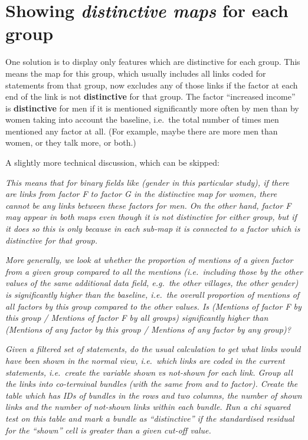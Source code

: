 \documentclass[
]{book}
\begin{document}
\hypertarget{showing-distinctive-maps-for-each-group}{%
\section{\texorpdfstring{Showing \emph{distinctive maps} for each group}{Showing distinctive maps for each group}}\label{showing-distinctive-maps-for-each-group}}

One solution is to display only features which are distinctive for each group. This means the map for this group, which usually includes all links coded for statements from that group, now excludes any of those links if the factor at each end of the link is not \textbf{distinctive} for that group. The factor ``increased income'' is \textbf{distinctive} for men if it is mentioned significantly more often by men than by women taking into account the baseline, i.e.~the total number of times men mentioned any factor at all. (For example, maybe there are more men than women, or they talk more, or both.)

A slightly more technical discussion, which can be skipped:

\emph{This means that for binary fields like (gender in this particular study), if there are links from factor F to factor G in the distinctive map for women, there cannot be any links between these factors for men. On the other hand, factor F may appear in both maps even though it is not distinctive for either group, but if it does so this is only because in each sub-map it is connected to a factor which is distinctive for that group.}

\emph{More generally, we look at whether the proportion of mentions of a given factor from a given group compared to all the mentions (i.e.~including those by the other values of the same additional data field, e.g.~the other villages, the other gender) is significantly higher than the baseline, i.e.~the overall proportion of mentions of all factors by this group compared to the other values. Is (Mentions of factor F by this group / Mentions of factor F by all groups) significantly higher than (Mentions of any factor by this group / Mentions of any factor by any group)?}

\emph{Given a filtered set of statements, do the usual calculation to get what links would have been shown in the normal view, i.e.~which links are coded in the current statements, i.e.~create the variable shown vs not-shown for each link. Group all the links into co-terminal bundles (with the same from and to factor). Create the table which has IDs of bundles in the rows and two columns, the number of shown links and the number of not-shown links within each bundle. Run a chi squared test on this table and mark a bundle as ``distinctive'' if the standardised residual for the ``shown'' cell is greater than a given cut-off value.}
\end{document}
